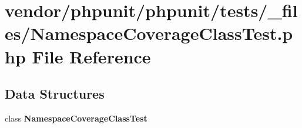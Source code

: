 \section{vendor/phpunit/phpunit/tests/\+\_\+files/\+Namespace\+Coverage\+Class\+Test.php File Reference}
\label{phpunit_2tests_2__files_2_namespace_coverage_class_test_8php}
\subsection*{Data Structures}
\begin{DoxyCompactItemize}
\item 
class {\bf Namespace\+Coverage\+Class\+Test}
\end{DoxyCompactItemize}
